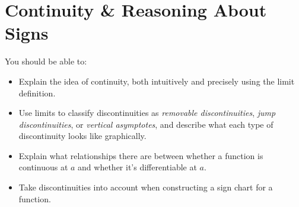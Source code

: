 \documentclass[main]{subfiles}
\begin{document}
\ifSubfilesClassLoaded{%
  \chaptermark{\chapterthree}
}{}

\section{Continuity \& Reasoning About Signs} \label{ws3-3}

\begin{problemonly}
  \begin{framed}

You should be able to:
    \begin{itemize}[topsep=0pt,partopsep=0pt,parsep=8pt,itemsep=0pt]
    \item Explain the idea of continuity, both intuitively and precisely using the limit definition.

    \item Use limits to classify discontinuities as \emph{removable discontinuities}, \emph{jump discontinuities}, or \emph{vertical asymptotes}, and describe what each type of discontinuity looks like graphically.

    \item Explain what relationships there are between whether a function is continuous at $a$ and whether it's differentiable at $a$.

    \item Take discontinuities into account when constructing a sign chart for a function. 
    \end{itemize}
  \end{framed}
\end{problemonly}
\end{document}
